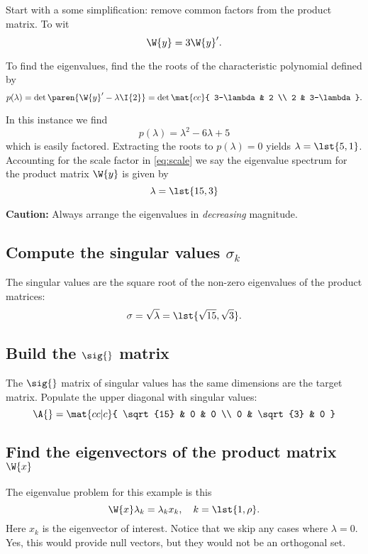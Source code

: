 Start with a some simplification: remove common factors from the product matrix. To wit
\begin{equation}
  \W{y}=3\W{y}'.
  \label{eq:scale}
\end{equation}

To find the eigenvalues, find the the roots of the  characteristic polynomial defined by
\begin{equation}
  p(\lambda) = \det \paren{\W{y}'-\lambda \I{2}} =
  \det \mat{cc}
  {
  3-\lambda & 2 \\
  2 & 3-\lambda
  }.
\end{equation}

In this instance we find
\begin{equation}
  p(\lambda) = \lambda^{2} - 6\lambda + 5
\end{equation}
which is easily factored. Extracting the roots to $p(\lambda) = 0$ yields $\lambda = \lst{5,1}$. Accounting for the scale factor in \eqref{eq:scale} we say the eigenvalue spectrum for the product matrix $\W{y}$ is given by
\begin{equation}
  \lambda = \lst{15, 3}
\end{equation}

\textbf{Caution:} Always arrange the eigenvalues in \textit{decreasing} magnitude.

\subsection{Compute the singular values $\sigma_{k}$}
The singular values are the square root of the non-zero eigenvalues of the product matrices:
\begin{equation}
  \sigma = \sqrt{\lambda} = \lst{\sqrt{15},\sqrt{3}}.
\end{equation}

\subsection{Build the $\sig{}$ matrix}
The $\sig{}$ matrix of singular values has the same dimensions are the target matrix. Populate the upper diagonal with singular values:
\begin{equation}
  \A{} = \mat{cc|c}
  {
  \sqrt{15} & 0 & 0 \\
  0 & \sqrt{3}  & 0
  }
\end{equation}

\subsection{Find the eigenvectors of the product matrix $\W{x}$}
The eigenvalue problem for this example is this
\begin{equation}
  \W{x}\lambda_{k} = \lambda_{k} x_{k}, \quad k=\lst{1,\rho}.
  \label{eq:raw:ev}
\end{equation}
Here $x_{k}$ is the eigenvector of interest. Notice that we skip any cases where $\lambda=0$. Yes, this would provide null vectors, but they would not be an orthogonal set.

